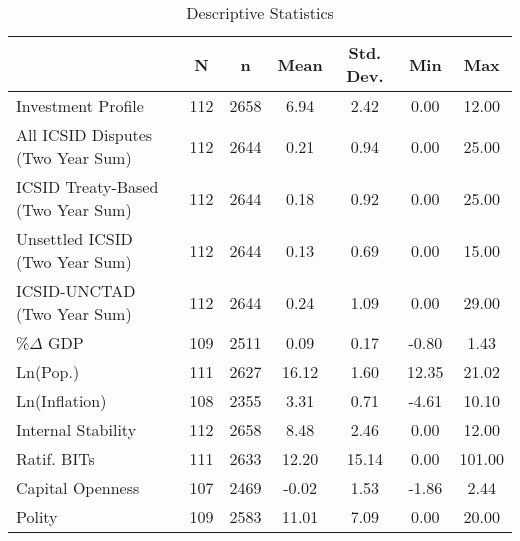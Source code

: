 \documentclass[12pt,onesided]{amsart}
\begin{document}
\begin{table}[ht]
\centering
\caption{Descriptive Statistics}
\label{tab:descStats}
\begin{tabular}{lcccccc}
	  \hline\hline
	  & N & n & Mean & Std. Dev. & Min & Max \\ 
	  \hline
Investment Profile & 112 & 2658 & 6.94 & 2.42 & 0.00 & 12.00 \\ 
  All ICSID Disputes (Two Year Sum) & 112 & 2644 & 0.21 & 0.94 & 0.00 & 25.00 \\ 
  ICSID Treaty-Based (Two Year Sum) & 112 & 2644 & 0.18 & 0.92 & 0.00 & 25.00 \\ 
  Unsettled ICSID (Two Year Sum) & 112 & 2644 & 0.13 & 0.69 & 0.00 & 15.00 \\ 
  ICSID-UNCTAD (Two Year Sum) & 112 & 2644 & 0.24 & 1.09 & 0.00 & 29.00 \\ 
  \%$\Delta$ GDP & 109 & 2511 & 0.09 & 0.17 & -0.80 & 1.43 \\ 
  Ln(Pop.) & 111 & 2627 & 16.12 & 1.60 & 12.35 & 21.02 \\ 
  Ln(Inflation) & 108 & 2355 & 3.31 & 0.71 & -4.61 & 10.10 \\ 
  Internal Stability & 112 & 2658 & 8.48 & 2.46 & 0.00 & 12.00 \\ 
  Ratif. BITs & 111 & 2633 & 12.20 & 15.14 & 0.00 & 101.00 \\ 
  Capital Openness & 107 & 2469 & -0.02 & 1.53 & -1.86 & 2.44 \\ 
  Polity & 109 & 2583 & 11.01 & 7.09 & 0.00 & 20.00 \\ 
	   \hline\hline
\end{tabular}
\end{table}

\end{document}
